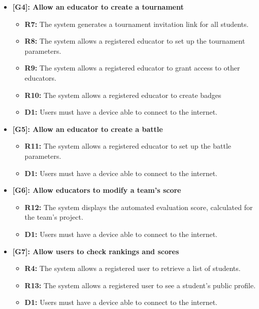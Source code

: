 \documentclass[12pt,oneside,a4paper]{article}
\begin{document}
\begin{itemize}
\begin{itemize}
        \item \textbf{D2:} Users give consent to the platform to receive notifications. 
    \end{itemize}$\\$
    \item \textbf{[G4]: Allow an educator to create a tournament}
    \begin{itemize}
        \item \textbf{R7:} The system generates a tournament invitation link for all students. 
        \item \textbf{R8:} The system allows a registered educator to set up the tournament parameters.
        \item \textbf{R9:} The system allows a registered educator to grant access to other educators.
        \item \textbf{R10:} The system allows a registered educator to create badges
        \item \textbf{D1:} Users must have a device able to connect to the internet.
    \end{itemize}
    \item \textbf{[G5]: Allow an educator to create a battle}
    \begin{itemize}
        \item \textbf{R11:} The system allows a registered educator to set up the battle parameters.
        \item \textbf{D1:} Users must have a device able to connect to the internet.
    \end{itemize}
    \item \textbf{[G6]: Allow educators to modify a team's score}
    \begin{itemize}
        \item \textbf{R12:} The system displays the automated evaluation score, calculated for the team's project.
        \item \textbf{D1:} Users must have a device able to connect to the internet.
    \end{itemize}
    \item \textbf{[G7]: Allow users to check rankings and scores}
    \begin{itemize}
        \item \textbf{R4:} The system allows a registered user to retrieve a list of students.
        \item \textbf{R13:} The system allows a registered user to see a student's public profile.
        \item \textbf{D1:} Users must have a device able to connect to the internet.
    \end{itemize}
\end{itemize}
\end{document}
